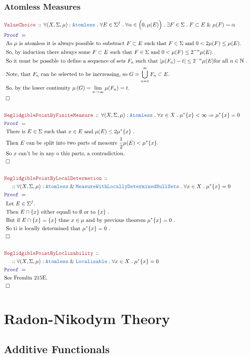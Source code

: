 \documentclass[12pt]{scrartcl}
\newcommand{\TYPE}[1]{\textcolor{NavyBlue}{\mathtt{#1}}}
\newcommand{\LOGIC}[1]{\textcolor{Blue}{\mathtt{#1}}}
\newcommand{\THM}[1]{\textcolor{Maroon}{\mathtt{#1}}}
\renewcommand{\.}{\; . \;}
\newcommand{\Theorem}[2]{& \THM{#1} \, :: \, #2 \\ & \Proof = \\ }
\newcommand{\NewLine}{\\ & \kern 1pc}
\newcommand{\Page}[1]{ \begin{align*} #1 \end{align*}   }
\renewcommand{\And}{\; \& \;}
\newcommand{\Imply}{\Rightarrow}
\newcommand{\Nat}{\mathbb{N} }
\newcommand{\QED}{\; \square}
\newcommand{\EndProof}{& \QED \\}
\newcommand{\Proof}{\LOGIC{Proof} \; }
\newcommand{\Explain}[1]{& \text{#1.} \\}
\newcommand{\Aless}{\TYPE{Atomless}}
\newcommand{\Loc}{\TYPE{Localizable}}
\newcommand{\MwLDNS}{\TYPE{MeasureWithLocallyDeterminedNullSets}}
\begin{document}
\subsubsection{Atomless Measures}
\Page{
	\Theorem{ValueChoice}
	{
		\forall (X,\Sigma,\mu) : \Aless \.
		\forall	E \in \Sigma^f \.
		\forall \alpha \in \Big(0,\mu(E)\Big) \.
		\exists  F \in \Sigma \.
		F \subset E  \And \mu(F) = \alpha
	}
	\Explain{
		As $\mu$ is atomless it is always possible to substract 
		$F \subset E$ such that $F \in \Sigma$ and $0 < 2\mu(F) \le  \mu(E) $}
	\Explain{
		So, by induction there always some $F \subset E$ such that 
		$F \in \Sigma$ and $0 < \mu(F) \le 2^{-n} \mu(E)$}
	\Explain{
		So it must be possible to define a sequence of sets $F_n$ such that
		$|\mu(F_n) - t| \le 2^{-n}\mu(E)$for all $n \in \Nat$	}
	\Explain{
		Note, that $F_n$ can be selected to be inccreasing, so
		$G = \bigcup^\infty_{n=1} F_n \subset E$}
	\Explain{
		So, by the lower continuity $\mu\left( G  \right) = \lim_{n \to \infty} \mu(F_n)  =  t$}
	\EndProof
	\\
	\Theorem{NeglidgiblePointByFiniteMeasure}
	{
		\forall (X,\Sigma,\mu) : \Aless \.
		\forall x \in X \.
		\mu^*\{x\} < \infty
		\Imply
		\mu^*\{x\} = 0	
	}
	\Explain{ There is $E \in \Sigma$ such that $x \in E$ and $\mu(E) \le 2\mu^*\{x\}$ }
	\Explain{ Then $E$ can be split into two parts of measure $\frac{1}{2}\mu(E) < \mu^*\{x\}$}
	\Explain{ So $x$ can't be in any o this parts, a contradiction}
	\EndProof
	\\
	\Theorem{NeglidgiblePointByLocalDetermetion}
	{
		\NewLine ::		
		\forall (X,\Sigma,\mu) : \Aless \And \MwLDNS \.
		\forall x \in X \.
		\mu^*\{x\} = 0	
	}
	\Explain{
		Let $E\in\Sigma^f$}
	\Explain{
		Then $E \cap \{x\}$ either equall to $\emptyset$ or to $\{x\}$
		}
	\Explain{
		But if $E \cap \{x\} = \{x\}$ thne $x \in \mu$ and by 
		previous theorem $\mu^*\{x\}=0$
	}
	\Explain{
		So ti is locally determined that $\mu^*\{x\} = 0$
	}
	\EndProof
	\\
	\Theorem{NeglidgiblePointByLoclizability}
	{
		\NewLine ::		
		\forall (X,\Sigma,\mu) : \Aless \And \Loc \.
		\forall x \in X \.
		\mu^*\{x\} = 0	
	}
	\Explain{See Fremlin 215E}
	\EndProof
}
\newpage
\section{Radon-Nikodym Theory}
\subsection{Additive Functionals}
\end{document}
